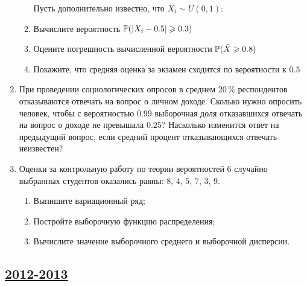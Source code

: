 \begin{enumerate}
\begin{enumerate}
Пусть дополнительно известно, что $X_i \sim U(0,1)$:
\item Вычислите вероятность $\P(|X_i-0.5|\geqslant 0.3)$
\item Оцените погрешность вычисленной вероятности $\P(\bar{X}\geqslant 0.8)$
\item Покажите, что средняя оценка за экзамен сходится по вероятности к $0.5$

\end{enumerate}

\item При проведении социологических опросов в среднем $20\,\%$ респондентов
отказываются отвечать на вопрос о личном доходе. Сколько нужно опросить человек,
чтобы с вероятностью $0.99$ выборочная доля отказавшихся отвечать на вопрос о доходе
не превышала $0.25$? Насколько изменится ответ на предыдущий вопрос, если средний
процент отказывающихся отвечать неизвестен?

\item Оценки за контрольную работу по теории вероятностей $6$ случайно выбранных
студентов оказались равны: $8$, $4$, $5$, $7$, $3$, $9$.
\begin{enumerate}
\item Выпишите вариационный ряд;
\item Постройте выборочную функцию распределения;
\item Вычислите значение выборочного среднего и выборочной дисперсии.
\end{enumerate}
\end{enumerate}



\newpage
\subsection[2012-2013]{\hyperref[sec:sol_kr_02_2012_2013]{2012-2013}}
\label{sec:kr_02_2012_2013}

